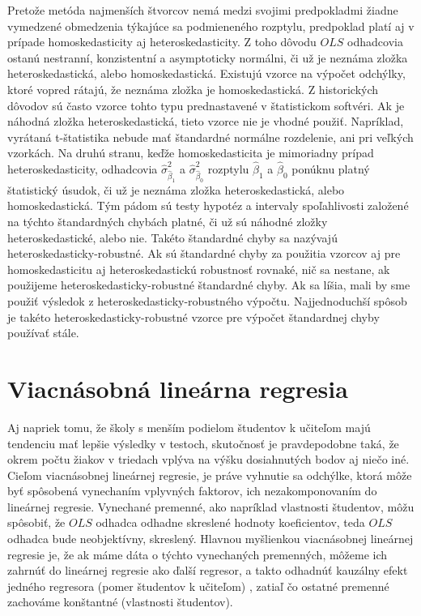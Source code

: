 \documentclass[]{tukediphc}
\begin{document}
Pretože metóda najmenších štvorcov nemá medzi svojimi predpokladmi žiadne vymedzené obmedzenia týkajúce sa podmieneného rozptylu, predpoklad platí aj v prípade homoskedasticity aj heteroskedasticity. Z toho dôvodu $OLS$ odhadcovia ostanú nestranní, konzistentní a asymptoticky normálni, či už je neznáma zložka heteroskedastická, alebo homoskedastická. Existujú vzorce na výpočet odchýlky, ktoré vopred rátajú, že neznáma zložka je homoskedastická. Z historických dôvodov sú často vzorce tohto typu prednastavené v štatistickom softvéri. Ak je náhodná zložka heteroskedastická, tieto vzorce nie je vhodné použiť. Napríklad, vyrátaná t-štatistika nebude mať štandardné normálne rozdelenie, ani pri veľkých vzorkách. Na druhú stranu, keďže homoskedasticita je mimoriadny prípad heteroskedasticity, odhadcovia $\hat\sigma^2_{\hat\beta_{1}}$ a $\hat\sigma^2_{\hat\beta_{0}}$ rozptylu $\hat\beta_{1}$ a $\hat\beta_{0}$ ponúknu platný štatistický úsudok, či už je neznáma zložka heteroskedastická, alebo homoskedastická. Tým pádom sú testy hypotéz a intervaly spoľahlivosti založené na týchto štandardných chybách platné, či už sú náhodné zložky heteroskedastické, alebo nie. Takéto štandardné chyby sa nazývajú heteroskedasticky-robustné. Ak sú štandardné chyby za použitia vzorcov aj pre homoskedasticitu aj heteroskedastickú robustnosť rovnaké, nič sa nestane, ak použijeme heteroskedasticky-robustné štandardné chyby. Ak sa líšia, mali by sme použiť výsledok z heteroskedasticky-robustného výpočtu. Najjednoduchší spôsob je takéto heteroskedasticky-robustné vzorce pre výpočet štandardnej chyby používať stále. 

\newpage
\section{Viacnásobná lineárna regresia}

Aj napriek tomu, že školy s menším podielom študentov k učiteľom majú tendenciu mať lepšie výsledky v testoch, skutočnosť je pravdepodobne taká, že okrem počtu žiakov v triedach vplýva na výšku dosiahnutých bodov aj niečo iné. Cieľom viacnásobnej lineárnej regresie, je práve vyhnutie sa odchýlke, ktorá môže byť spôsobená vynechaním vplyvných faktorov, ich  nezakomponovaním do lineárnej regresie. Vynechané premenné, ako napríklad vlastnosti študentov, môžu spôsobiť, že $OLS$ odhadca odhadne skreslené hodnoty koeficientov, teda $OLS$ odhadca bude neobjektívny, skreslený. Hlavnou myšlienkou viacnásobnej lineárnej regresie je, že ak máme dáta o týchto vynechaných premenných, môžeme ich zahrnúť do lineárnej regresie ako ďalší regresor, a takto odhadnúť kauzálny efekt jedného regresora (pomer študentov k učiteľom) , zatiaľ čo ostatné premenné zachováme konštantné (vlastnosti študentov). 
\end{document}
